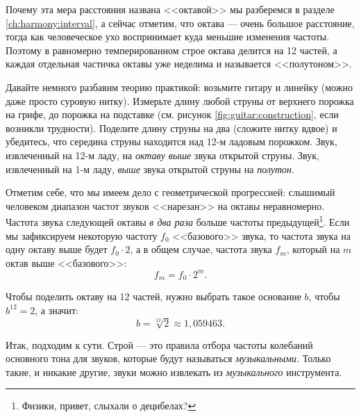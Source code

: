 Почему эта мера расстояния названа <<октавой>> мы разберемся в разделе \ref{ch:harmony:interval}, а сейчас отметим, что октава --- очень большое расстояние, тогда как человеческое ухо воспринимает куда меньшие изменения частоты. Поэтому в равномерно темперированном строе октава делится на 12 частей, а каждая отдельная частичка октавы уже неделима и называется <<полутоном>>.

\begin{Example}
    Давайте немного разбавим теорию практикой: возьмите гитару и линейку (можно даже просто суровую нитку). Измерьте длину любой струны от верхнего порожка на грифе, до порожка на подставке (см. рисунок \ref{fig:guitar:construction}, если возникли трудности). Поделите длину струны на два (сложите нитку вдвое) и убедитесь, что середина струны находится над 12-м ладовым порожком. Звук, извлеченный на 12-м ладу, на \emph{октаву выше} звука открытой струны. Звук, извлеченный на 1-м ладу, \emph{выше} звука открытой струны на \emph{полутон}.
\end{Example}

Отметим себе, что мы имеем дело с геометрической прогрессией: слышимый человеком диапазон частот звуков <<нарезан>> на октавы неравномерно. Частота звука следующей октавы \emph{в два раза} больше частоты предыдущей\footnote{Физики, привет, слыхали о децибелах?}. Если мы зафиксируем некоторую частоту $f_0$ <<базового>> звука, то частота звука на одну октаву выше будет $f_0\cdot 2$, а в общем случае, частота звука $f_m$, который на $m$ октав выше <<базового>>:
\[
    f_m = f_0\cdot 2^m.
\]

Чтобы поделить октаву на 12 частей, нужно выбрать такое основание $b$, чтобы $b^{12} = 2$, а значит:
\[
    b = \sqrt[12]{2} \approx 1,059463.
\]

Итак, подходим к сути. Строй --- это правила отбора частоты колебаний основного тона для звуков, которые будут называться \emph{музыкальными}. Только такие, и никакие другие, звуки можно извлекать из \emph{музыкального} инструмента.

